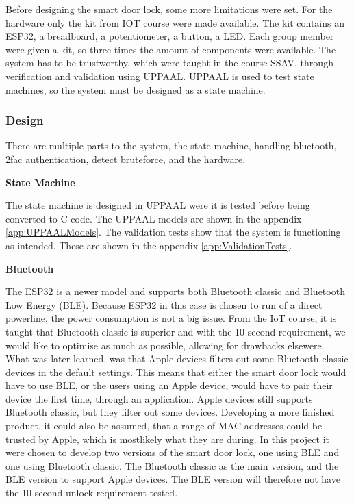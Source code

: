 
Before designing the smart door lock, some more limitations were set.
For the hardware only the kit from IOT course were made available.
The kit contains an ESP32, a breadboard, a potentiometer, a button, a LED.
Each group member were given a kit, so three times the amount of components were available.
The system has to be trustworthy, which were taught in the course SSAV, through verification and validation using UPPAAL.
UPPAAL is used to test state machines, so the system must be designed as a state machine.

\subsubsection{Design}

There are multiple parts to the system, the state machine, handling bluetooth, 2fac authentication, detect bruteforce, and the hardware.

\textbf{State Machine}

The state machine is designed in UPPAAL were it is tested before being converted to C code.
The UPPAAL models are shown in the appendix \ref{app:UPPAALModels}.
The validation tests show that the system is functioning as intended.
These are shown in the appendix \ref{app:ValidationTests}.

\textbf{Bluetooth}

The ESP32 is a newer model and supports both Bluetooth classic and Bluetooth Low Energy (BLE).
Because ESP32 in this case is chosen to run of a direct powerline, the power consumption is not a big issue.
From the IoT course, it is taught that Bluetooth classic is superior and with the 10 second requirement, we would like to optimise as much as possible, allowing for drawbacks elsewere.
What was later learned, was that Apple devices filters out some Bluetooth classic devices in the default settings.
This means that either the smart door lock would have to use BLE, or the users using an Apple device, would have to pair their device the first time, through an application.
Apple devices still supports Bluetooth classic, but they filter out some devices.
Developing a more finished product, it could also be assumed, that a range of MAC addresses could be trusted by Apple, which is mostlikely what they are during.
In this project it were chosen to develop two versions of the smart door lock, one using BLE and one using Bluetooth classic.
The Bluetooth classic as the main version, and the BLE version to support Apple devices.
The BLE version will therefore not have the 10 second unlock requirement tested.

